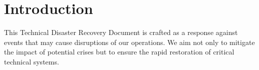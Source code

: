 \section{Introduction}

This Technical Disaster Recovery Document is crafted as a response against events that may cause disruptions of our operations. We aim not only to mitigate the impact of potential crises but to ensure the rapid restoration of critical technical systems.

